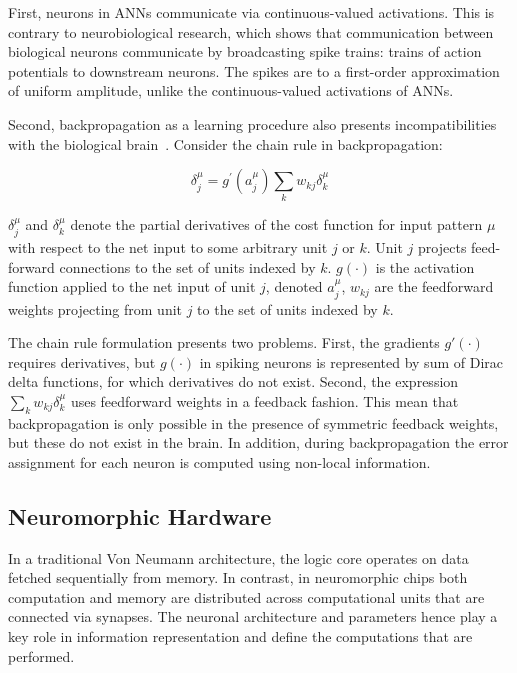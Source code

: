 \documentclass[fyp]{socreport}
\begin{document}
First, neurons in ANNs communicate via continuous-valued activations.  This is
contrary to neurobiological research, which shows that communication between
biological neurons communicate by broadcasting spike trains: trains of action
potentials to downstream neurons. The spikes are to a first-order approximation
of uniform amplitude, unlike the continuous-valued activations of ANNs.

Second, backpropagation as a learning procedure also presents incompatibilities
with the biological brain~\cite{TAVANAEI201947}.  Consider the chain rule in
backpropagation:

\begin{equation} \label{chainrule} \delta_{j}^{\mu}=g^{\prime}\left(a_{j}^{\mu}\right) \sum_{k} w_{k j} \delta_{k}^{\mu}
\end{equation}

\(\delta_{j}^{\mu}\) and \(\delta_{k}^{\mu}\) denote the partial derivatives of
the cost function for input pattern \(\mu\) with respect to the net input to
some arbitrary unit \(j\) or \(k\). Unit \(j\) projects feed-forward connections
to the set of units indexed by \(k\).  \(g(\cdot)\) is the activation function
applied to the net input of unit \(j\), denoted \(a_j^{\mu}\), \(w_{kj}\) are
the feedforward weights projecting from unit \(j\) to the set of units indexed
by \(k\).

The chain rule formulation presents two problems. First, the gradients
\(g'(\cdot)\) requires derivatives, but \(g(\cdot)\) in spiking neurons is
represented by sum of Dirac delta functions, for which derivatives do not
exist. Second, the expression \(\sum_{k} w_{k j} \delta_{k}^{\mu}\) uses
feedforward weights in a feedback fashion. This mean that backpropagation is
only possible in the presence of symmetric feedback weights, but these do not
exist in the brain. In addition, during backpropagation the error assignment for
each neuron is computed using non-local information.

\subsection{Neuromorphic Hardware\label{neuromorphic}}

In a traditional Von Neumann architecture, the logic core operates on data
fetched sequentially from memory. In contrast, in neuromorphic chips both
computation and memory are distributed across computational units that are
connected via synapses. The neuronal architecture and parameters hence play a
key role in information representation and define the computations that are
performed.
\end{document}
